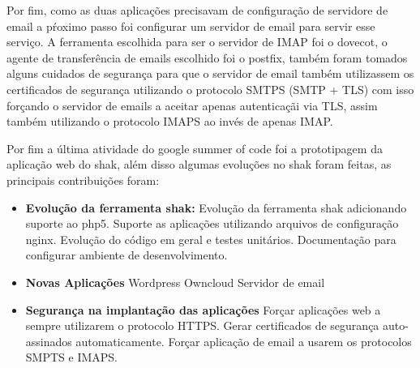 Por fim, como as duas aplicações precisavam de configuração de servidore de email
a pŕoximo passo foi configurar um servidor de email para servir esse serviço. A
ferramenta escolhida para ser o servidor de IMAP foi o dovecot, o agente de
transferência de emails escolhido foi o postfix, também foram tomados alguns
 cuidados de segurança para que o servidor de email também utilizassem os certificados
 de segurança utilizando o protocolo SMTPS (SMTP + TLS) com isso forçando o servidor
 de emails a aceitar apenas autenticaçãi via TLS, assim também utilizando o
 protocolo IMAPS ao invés de apenas IMAP.

Por fim a última atividade do google summer of code foi a prototipagem da aplicação
web do shak, além disso algumas evoluções no shak foram feitas, as principais
contribuições foram:

\begin{itemize}
  \item  \textbf{Evolução da ferramenta shak:}
  \subitem Evolução da ferramenta shak adicionando suporte ao php5.
  \subitem Suporte as aplicações utilizando arquivos de configuração nginx.
  \subitem Evolução do código em geral e testes unitários.
  \subitem Documentação para configurar ambiente de desenvolvimento.

  \item  \textbf{Novas Aplicações}
  \subitem Wordpress
  \subitem Owncloud
  \subitem Servidor de email

  \item  \textbf{Segurança na implantação das aplicações}
  \subitem Forçar aplicações web a sempre utilizarem o protocolo HTTPS.
  \subitem Gerar certificados de segurança auto-assinados automaticamente.
  \subitem Forçar aplicação de email a usarem os protocolos SMPTS e IMAPS.
\end{itemize}
